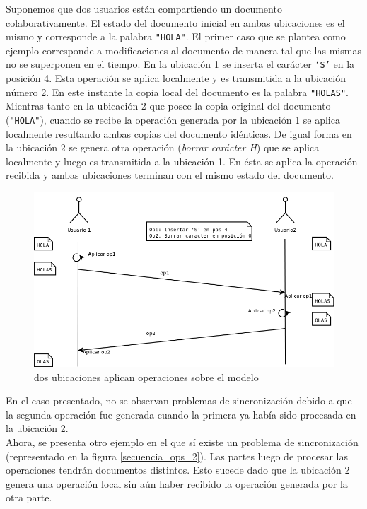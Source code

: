 \documentclass[12pt,a4paper]{article}
\begin{document}
	Suponemos que dos usuarios están compartiendo un documento colaborativamente. El estado del documento 
	inicial en ambas ubicaciones es el mismo y corresponde a la palabra \texttt{"HOLA"}.
	El primer caso que se plantea como ejemplo corresponde a modificaciones al documento de manera tal 
	que las mismas no se superponen en el tiempo.
	En la ubicación 1 se inserta el carácter \texttt{`S'} en la posición 4. Esta operación se aplica localmente
	y es transmitida a la ubicación número 2. En este instante la copia local del documento es
	la palabra \texttt{"HOLAS"}.
	Mientras tanto en la ubicación 2 que posee la copia original del documento (\texttt{"HOLA"}), cuando se recibe
	la operación generada por la ubicación 1 se aplica localmente resultando ambas copias del documento idénticas.
	De igual forma en la ubicación 2 se genera otra operación (\textit{borrar carácter H}) que se aplica localmente
	y luego es transmitida a la ubicación 1. En ésta se aplica la operación recibida y ambas ubicaciones terminan 
	con el mismo estado del documento.

	\begin{figure}[!ht]
		\begin{center}
			\includegraphics[width=14cm]{sincronizacion_ok.png}
			\caption{\label{secuencia_ops_1} dos ubicaciones aplican operaciones sobre el modelo }
		\end{center}
	\end{figure}

	En el caso presentado, no se observan problemas de sincronización debido a que la segunda operación fue 
	generada cuando la primera ya había sido procesada en la ubicación 2. \\

	Ahora, se presenta otro ejemplo en el que sí existe un problema de sincronización (representado en la figura
	\ref{secuencia_ops_2}). Las partes luego de procesar las operaciones tendrán documentos distintos. Esto sucede dado
	que la ubicación 2 genera una operación local sin aún haber recibido la operación generada por la otra parte.
	
\end{document}
